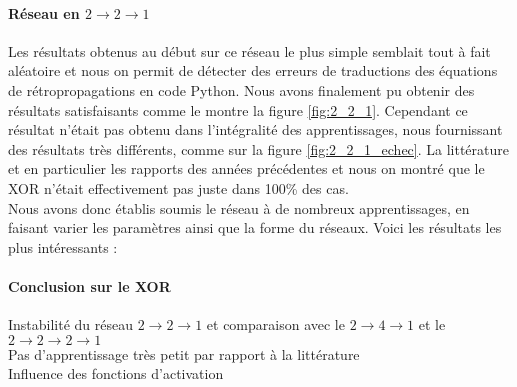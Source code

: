 \paragraph{Réseau en $2\rightarrow2\rightarrow1$} %

Les résultats obtenus au début sur ce réseau le plus simple semblait tout à fait aléatoire et nous on permit de détecter des erreurs de traductions des équations de rétropropagations en code Python. Nous avons finalement pu obtenir des résultats satisfaisants comme le montre la figure \ref{fig:2_2_1}. Cependant ce résultat n'était pas obtenu dans l'intégralité des apprentissages, nous fournissant des résultats très différents, comme sur la figure \ref{fig:2_2_1_echec}. La littérature et en particulier les rapports des années précédentes \cite{appartement} et \cite{Pinaple} nous on montré que le XOR n'était effectivement pas juste dans 100\% des cas.\\
Nous avons donc établis soumis le réseau à de nombreux apprentissages, en faisant varier les paramètres ainsi que la forme du réseaux. Voici les résultats les plus intéressants :


\paragraph{Conclusion sur le XOR} %
\label{par:conclusion_sur_le_xor}
Instabilité du réseau $2\rightarrow2\rightarrow1$ et comparaison avec le $ 2 \rightarrow 4 \rightarrow 1 $ et le $2 \rightarrow 2 \rightarrow 2 \rightarrow 1 $ \\
Pas d'apprentissage très petit par rapport à la littérature\\
Influence des fonctions d'activation






